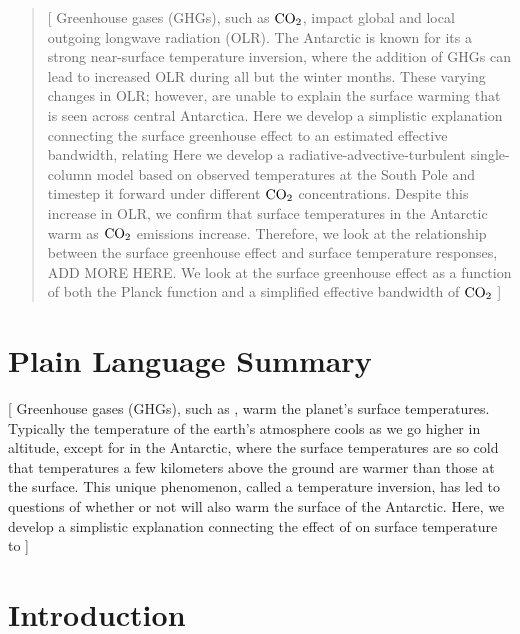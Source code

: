 \documentclass[draft]{agujournal2019}
\begin{document}
\begin{abstract}
[ Greenhouse gases (GHGs), such as $\ce{CO_2}$, impact global and local outgoing longwave radiation (OLR). The Antarctic is known for its a strong near-surface temperature inversion, where the addition of GHGs can lead to increased OLR during all but the winter months. These varying changes in OLR; however, are unable to explain the surface warming that is seen across central Antarctica. Here we develop a simplistic explanation connecting the surface greenhouse effect to an estimated effective bandwidth, relating Here we develop a radiative-advective-turbulent single-column model based on observed temperatures at the South Pole and timestep it forward under different $\ce{\text{CO}_2}$ concentrations. Despite this increase in OLR, we confirm that surface temperatures in the Antarctic warm as $\ce{\text{CO}_2}$ emissions increase. Therefore, we look at the relationship between the surface greenhouse effect and surface temperature responses, ADD MORE HERE. We look at the surface greenhouse effect as a function of both the Planck function and a simplified effective bandwidth of $\ce{\text{CO}_2}$ ]
\end{abstract}

\section*{Plain Language Summary}
[ Greenhouse gases (GHGs), such as , warm the planet's surface temperatures. Typically the temperature of the earth's atmosphere cools as we go higher in altitude, except for in the Antarctic, where the surface temperatures are so cold that temperatures a few kilometers above the ground are warmer than those at the surface. This unique phenomenon, called a temperature inversion, has led to questions of whether or not  will also warm the surface of the Antarctic. Here, we develop a simplistic explanation connecting the effect of  on surface temperature to ]


%
%

\section{Introduction}
%
\end{document}
